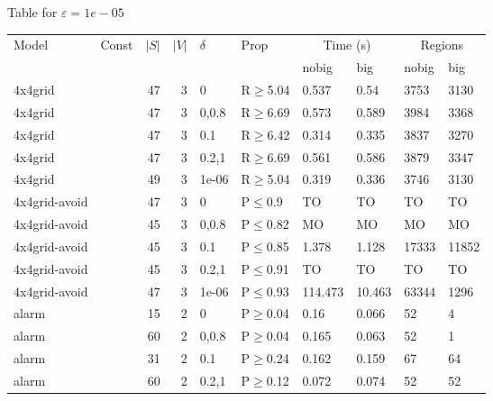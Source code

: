 \small Table for \(\varepsilon=1e-05\)
\begin{longtable}{llrrllllll}

        \toprule
        Model & Const & $|S|$ & $|V|$ & $\delta$ & Prop & \multicolumn{2}{c}{Time (s)} & \multicolumn{2}{c}{Regions} \\
        \cmidrule(ll){7-8} \cmidrule(ll){9-10}
        & & & & & & nobig & big & nobig & big \\
        \midrule
        
 4x4grid       &           &     	47 &   3 & 0     & R$\geq$5.04  & 0.537    & 0.54     & 3753    & 3130   \\
 4x4grid       &           &     	47 &   3 & 0,0.8 & R$\geq$6.69  & 0.573    & 0.589    & 3984    & 3368   \\
 4x4grid       &           &     	47 &   3 & 0.1   & R$\geq$6.42  & 0.314    & 0.335    & 3837    & 3270   \\
 4x4grid       &           &     	47 &   3 & 0.2,1 & R$\geq$6.69  & 0.561    & 0.586    & 3879    & 3347   \\
 4x4grid       &           &     	49 &   3 & 1e-06 & R$\geq$5.04  & 0.319    & 0.336    & 3746    & 3130   \\
 4x4grid-avoid &           &     	47 &   3 & 0     & P$\leq$0.9   & TO       & TO       & TO      & TO     \\
 4x4grid-avoid &           &     	45 &   3 & 0,0.8 & P$\leq$0.82  & MO       & MO       & MO      & MO     \\
 4x4grid-avoid &           &     	45 &   3 & 0.1   & P$\leq$0.85  & 1.378    & 1.128    & 17333   & 11852  \\
 4x4grid-avoid &           &     	45 &   3 & 0.2,1 & P$\leq$0.91  & TO       & TO       & TO      & TO     \\
 4x4grid-avoid &           &     	47 &   3 & 1e-06 & P$\leq$0.93  & 114.473  & 10.463   & 63344   & 1296   \\
 alarm         &           &     	15 &   2 & 0     & P$\geq$0.04  & 0.16     & 0.066    & 52      & 4      \\
 alarm         &           &     	60 &   2 & 0,0.8 & P$\geq$0.04  & 0.165    & 0.063    & 52      & 1      \\
 alarm         &           &     	31 &   2 & 0.1   & P$\geq$0.24  & 0.162    & 0.159    & 67      & 64     \\
 alarm         &           &     	60 &   2 & 0.2,1 & P$\geq$0.12  & 0.072    & 0.074    & 52      & 52     \\

\end{longtable}
